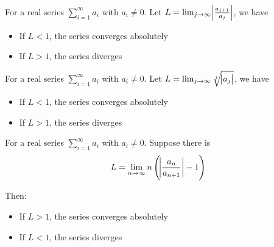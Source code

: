 \begin{theorem}
    For a real series $\sum_{i=1}^\infty a_i$ with $a_i \neq 0$. Let $L = \lim_{j \rightarrow \infty} \abs{\frac{a_{j+1}}{a_j}}$, we have
    \begin{itemize}
        \item If $L < 1$, the series converges absolutely
        \item If $L > 1$, the series diverges
    \end{itemize}
\end{theorem}

\begin{theorem}
    For a real series $\sum_{i=1}^\infty a_i$ with $a_i \neq 0$. Let $L = \lim_{j \rightarrow \infty}  \sqrt[j]{\abs{a_j}}$, we have
    \begin{itemize}
        \item If $L < 1$, the series converges absolutely
        \item If $L > 1$, the series diverges
    \end{itemize}
\end{theorem}

\begin{theorem}
    For a real series $\sum_{i=1}^\infty a_i$ with $a_i \neq 0$. Suppose there is 
    \begin{equation}
        L = \lim_{n \rightarrow \infty} n \left( \abs{\frac{a_n}{a_{n+1}}} - 1 \right)
    \end{equation}
    
    Then:
    \begin{itemize}
        \item If $L > 1$, the series converges absolutely
        \item If $L < 1$, the series diverges
    \end{itemize}
\end{theorem}


